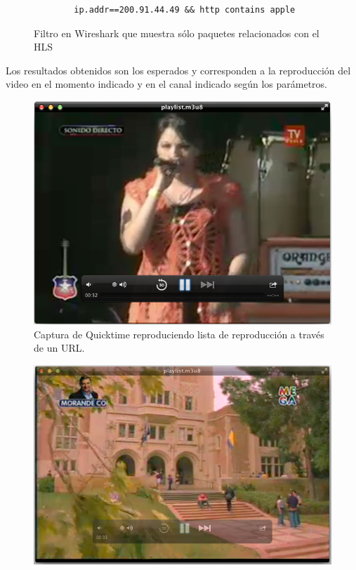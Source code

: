 \begin{figure}[H]
	\centering
\begin{lstlisting}
		ip.addr==200.91.44.49 && http contains apple
\end{lstlisting}
\caption{Filtro en Wireshark que muestra sólo paquetes relacionados con el HLS}
\end{figure}


Los resultados obtenidos son los esperados y corresponden a la reproducción del video en el momento indicado y en el canal indicado según los parámetros.

\begin{figure}[H]
	\centering
	\includegraphics[scale=0.5]{imgs/qt-tvn.png}
	\caption{Captura de Quicktime reproduciendo lista de reproducción a través de un URL.}
	\label{qt-tvn}	
\end{figure}

\begin{figure}[H]
	\centering
	\includegraphics[scale=0.5]{imgs/qt-mega.png}
	\caption{}
	\label{qt-mega}	
\end{figure}

